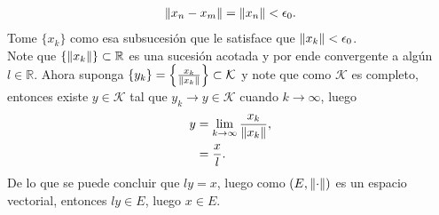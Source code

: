 \begin{homeworkProblem}
\begin{solution}
    \begin{align*}
      \lVert x_n-x_m\rVert=\lVert x_n\rVert<\epsilon_0.
    \end{align*}
    Tome $\{x_k\}$ como esa subsucesión que le satisface que $\lVert x_k\rVert<\epsilon_0$.\\
    Note que $\{\lVert x_k\rVert\}\subset \mathbb{R}$ es una sucesión acotada y por ende convergente a algún $l\in\mathbb{R}$.
    Ahora suponga $\{y_k\}=\left\{\frac{x_k}{\lVert x_k\rVert}\right\}\subset\mathcal{K}$ y note que como $\mathcal{K}$ es completo, entonces existe $y\in \mathcal{K}$ tal que $y_k\to y\in \mathcal{K}$ cuando $k\to\infty$, luego
    \begin{align*}
      y&=\lim_{k \to \infty}\frac{x_k}{\lVert x_k\rVert},\\
      &=\frac{x}{l}.
    \end{align*}
    De lo que se puede concluir que $ly=x$, luego como $(E,\lVert\cdot\rVert)$ es un espacio vectorial, entonces $ly\in E$, luego $x\in E$. 
  \end{solution}
\end{homeworkProblem}
